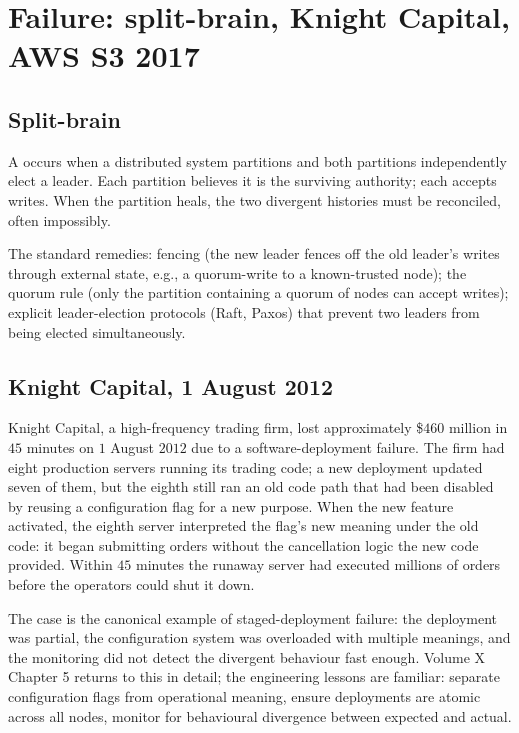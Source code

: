 \section{Failure: split-brain, Knight Capital, AWS S3 2017}

\subsection{Split-brain}

A  occurs when a distributed system partitions and both partitions independently elect a leader. Each partition believes it is the surviving authority; each accepts writes. When the partition heals, the two divergent histories must be reconciled, often impossibly.

The standard remedies: fencing (the new leader fences off the old leader's writes through external state, e.g., a quorum-write to a known-trusted node); the quorum rule (only the partition containing a quorum of nodes can accept writes); explicit leader-election protocols (Raft, Paxos) that prevent two leaders from being elected simultaneously.

\subsection{Knight Capital, 1 August 2012}

Knight Capital, a high-frequency trading firm, lost approximately \$$460$ million in $45$ minutes on $1$ August $2012$ due to a software-deployment failure. The firm had eight production servers running its trading code; a new deployment updated seven of them, but the eighth still ran an old code path that had been disabled by reusing a configuration flag for a new purpose. When the new feature activated, the eighth server interpreted the flag's new meaning under the old code: it began submitting orders without the cancellation logic the new code provided. Within $45$ minutes the runaway server had executed millions of orders before the operators could shut it down.

The case is the canonical example of staged-deployment failure: the deployment was partial, the configuration system was overloaded with multiple meanings, and the monitoring did not detect the divergent behaviour fast enough. Volume X Chapter 5 returns to this in detail; the engineering lessons are familiar: separate configuration flags from operational meaning, ensure deployments are atomic across all nodes, monitor for behavioural divergence between expected and actual.

